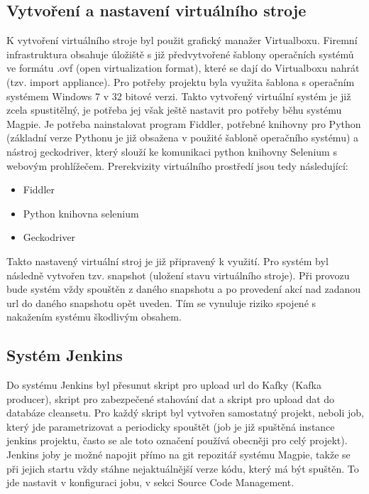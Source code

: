 \documentclass[thesis=M,czech,hidelinks]{FITthesis}[2013/05/06]
\begin{document}
\subsection{Vytvoření a nastavení virtuálního stroje} \label{sec:virtualka}
K vytvoření virtuálního stroje byl použit grafický manažer Virtualboxu. Firemní infrastruktura obsahuje úložiště s již předvytvořené šablony operačních systémů ve formátu .ovf (open virtualization format), které se dají do Virtualboxu nahrát (tzv. import appliance). Pro potřeby projektu byla využita šablona s operačním systémem Windows 7 v 32 bitové verzi. Takto vytvořený virtuální systém je již zcela spustitělný, je potřeba jej však ještě nastavit pro potřeby běhu systému Magpie. Je potřeba nainstalovat program Fiddler, potřebné knihovny pro Python (základní verze Pythonu je již obsažena v použité šabloně operačního systému) a nástroj geckodriver, který slouží ke komunikaci python knihovny Selenium s webovým prohlížečem. Prerekvizity virtuálního prostředí jsou tedy následující:
\begin{itemize}
	\item Fiddler
	\item Python knihovna selenium
	\item Geckodriver
\end{itemize}
Takto nastavený virtuální stroj je již připravený k využití. Pro systém byl následně vytvořen tzv. snapshot (uložení stavu virtuálního stroje). Při provozu bude systém vždy spouštěn z daného snapshotu a po provedení akcí nad zadanou url do daného snapshotu opět uveden. Tím se vynuluje riziko spojené s nakažením systému škodlivým obsahem.




\subsection{Systém Jenkins} \label{sec:jenk}
Do systému Jenkins byl přesunut skript pro upload url do Kafky (Kafka producer), skript pro zabezpečené stahování dat a skript pro upload dat do databáze cleansetu. Pro každý skript byl vytvořen samostatný projekt, neboli job, který jde parametrizovat a periodicky spouštět (job je již spuštěná instance jenkins projektu, často se ale toto označení používá obecněji pro celý projekt). Jenkins joby je možné napojit přímo na git repozitář systému Magpie, takže se při jejich startu vždy stáhne nejaktuálnější verze kódu, který má být spuštěn. To jde nastavit v konfiguraci jobu, v sekci Source Code Management.
\end{document}
